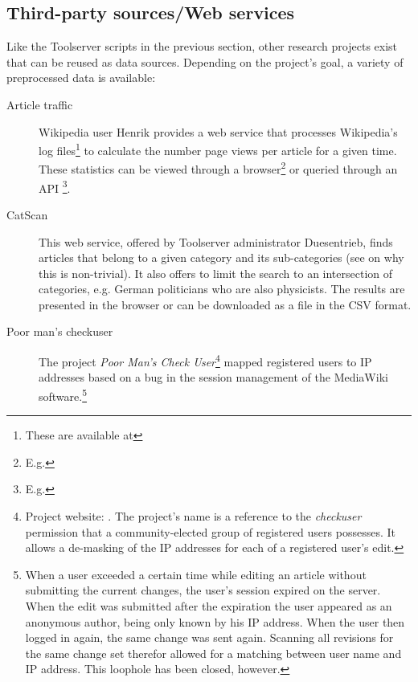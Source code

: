 \subsection{Third-party sources/Web services}\label{sub:webservices}

Like the Toolserver scripts in the previous section, other research projects exist that can be reused as data sources.
Depending on the project's goal, a variety of preprocessed data is available:

\begin{description}
\item[Article traffic] Wikipedia user Henrik provides a web service that processes Wikipedia's log files\footnote{These are available at } to calculate the number page views per article for a given time.
These statistics can be viewed through a browser\footnote{E.g. } or queried through an \ac{API} \footnote{E.g. }. 
\item[CatScan] This web service, offered by Toolserver administrator Duesentrieb, finds articles that belong to a given category and its sub-categories (see  on why this is non-trivial).
It also offers to limit the search to an intersection of categories, e.g. German politicians who are also physicists.
The results are presented in the browser or can be downloaded as a file in the \ac{CSV} format. 
\item[Poor man's checkuser] The project \emph{Poor Man's Check User}\footnote{Project website: . The project's name is a reference to the \emph{checkuser} permission that a community-elected group of registered users possesses. It allows a de-masking of the \ac{IP} addresses for each of a registered user's edit.} mapped registered users to \ac{IP} addresses based on a bug in the session management of the MediaWiki software.\footnote{When a user exceeded a certain time while editing an article without submitting the current changes, the user's session expired on the server. When the edit was submitted after the expiration the user appeared as an anonymous author, being only known by his \ac{IP} address. When the user then logged in again, the same change was sent again. Scanning all revisions for the same change set therefor allowed for a matching between user name and \ac{IP} address. This loophole has been closed, however.} 

\end{description}
